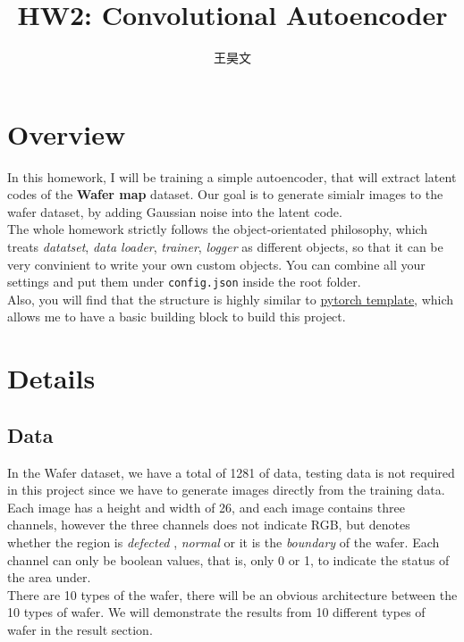 \documentclass[a4paper, 10]{article}
\begin{document}
\title{HW2: Convolutional Autoencoder}
\author{王昊文}

\maketitle


\section{Overview}
    In this homework, I will be training a simple autoencoder, that will 
    extract latent codes of the \textbf{Wafer map} dataset. Our goal is to 
    generate simialr images to the wafer dataset, by adding Gaussian noise
    into the latent code. \\
    \indent The whole homework strictly follows the object-orientated philosophy, which 
    treats \emph{datatset}, \emph{data loader}, \emph{trainer}, \emph{logger} as 
    different objects, so that it can be very convinient to write your own custom
    objects. You can combine all your settings and put them under \verb|config.json|
    inside the root folder. \\ 
    \indent Also, you will find that the structure is highly similar to 
    \href{https://github.com/victoresque/pytorch-template}{pytorch template},
    which allows me to have a basic building block to build this project.
    
\section{Details}
    \subsection{Data}
        In the Wafer dataset, we have a total of 1281 of data, testing
        data is not required in this project since we have to generate
        images directly from the training data. \\
        \indent Each image has a height and width of 26, and each image 
        contains three channels, however the three channels does not
        indicate RGB, but denotes whether the region is \emph{defected}
        , \emph{normal} or it is the \emph{boundary} of the wafer. Each
        channel can only be boolean values, that is, only 0 or 1, to 
        indicate the status of the area under. \\
        \indent There are 10 types of the wafer, there will be an obvious
        architecture between the 10 types of wafer. We will demonstrate
        the results from 10 different types of wafer in the result
        section.
\end{document}
